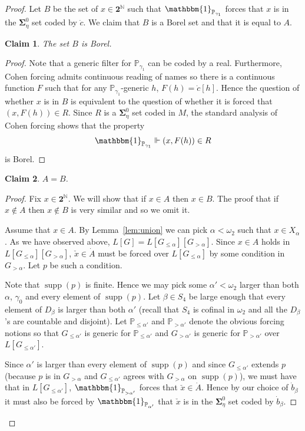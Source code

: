 \documentclass[11pt]{amsart}
\newcommand{\N}{\mathbb{N}}
\newcommand\two{\mathbf{2}}
\newcommand\bbP{\mathbb{P}}
\newcommand\bbone{\mathbbm{1}}
\newcommand\supp{\operatorname{supp}}
\newcommand\Cantor{\two^\N}
\theoremstyle{definition}
\theoremstyle{remark}
\theoremstyle{plain}
\newtheorem*{claim}{Claim}
\begin{document}
\begin{proof}
Let $B$ be the set of $x \in \Cantor$ such that $\bbone_{\bbP_{\gamma_1}}$ forces that $x$ is in the $\mathbf{\Sigma}^0_\eta$ set coded by $\dot{c}$. We claim that $B$ is a Borel set and that it is equal to $A$.

\begin{claim}
The set $B$ is Borel.
\end{claim}

\begin{proof}
Note that a generic filter for $\bbP_{\gamma_1}$ can be coded by a real. Furthermore, Cohen forcing admits continuous reading of names so there is a continuous function $F$ such that for any $\bbP_{\gamma_1}$-generic $h$, $F(h) = \dot{c}[h]$. Hence the question of whether $x$ is in $B$ is equivalent to the question of whether it is forced that $(x, F(h)) \in R$. Since $R$ is a $\mathbf{\Sigma}^0_\eta$ set coded in $M$, the standard analysis of Cohen forcing shows that the property
\[
    \bbone_{\bbP_{\gamma_1}} \Vdash (x, F(h)) \in R
\]
is Borel.
\end{proof}

\begin{claim}
$A = B$.
\end{claim}

\begin{proof}
Fix $x \in \Cantor$. We will show that if $x \in A$ then $x \in B$. The proof that if $x \notin A$ then $x \notin B$ is very similar and so we omit it.

Assume that $x \in A$. By Lemma~\ref{lem:union} we can pick $\alpha < \omega_2$ such that $x \in X_\alpha$. As we have observed above, $L[G] = L[G_{\leq \alpha}][G_{> \alpha}]$. Since $x \in A$ holds in $L[G_{\leq \alpha}][G_{> \alpha}]$, $\check{x} \in \dot{A}$ must be forced over $L[G_{\leq \alpha}]$ by some condition in $G_{> \alpha}$. Let $p$ be such a condition.

Note that $\supp(p)$ is finite. Hence we may pick some $\alpha' < \omega_2$ larger than both $\alpha$, $\gamma_0$ and every element of $\supp(p)$. Let $\beta \in S_4$ be large enough that every element of $D_\beta$ is larger than both $\alpha'$ (recall that $S_4$ is cofinal in $\omega_2$ and all the $D_\beta$'s are countable and disjoint). Let $\bbP_{\leq \alpha'}$ and $\bbP_{> \alpha'}$ denote the obvious forcing notions so that $G_{\leq \alpha'}$ is generic for $\bbP_{\leq \alpha'}$ and $G_{> \alpha'}$ is generic for $\bbP_{> \alpha'}$ over $L[G_{\leq \alpha'}]$.

Since $\alpha'$ is larger than every element of $\supp(p)$ and since $G_{\leq \alpha'}$ extends $p$ (because $p$ is in $G_{> \alpha}$ and $G_{\leq \alpha'}$ agrees with $G_{> \alpha}$ on $\supp(p)$), we must have that in $L[G_{\leq \alpha'}]$, $\bbone_{\bbP_{> \alpha'}}$ forces that $\check{x} \in \dot{A}$. Hence by our choice of $\dot{b}_{\beta}$ it must also be forced by $\bbone_{\bbP_{\alpha'}}$ that $\check{x}$ is in the $\mathbf{\Sigma}^0_\eta$ set coded by $\dot{b}_\beta$.


\end{proof}
\end{proof}
\end{document}
